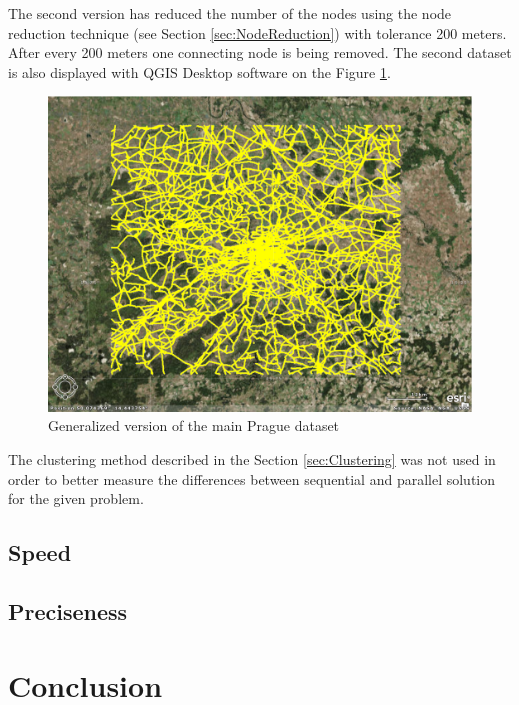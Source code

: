 \documentclass[thesis=M,english]{FITthesis}[2012/10/20]
\begin{document}
The second version has reduced the number of the nodes using the node reduction technique (see Section \ref{sec:NodeReduction}) with tolerance 200 meters. After every 200 meters one connecting node is being removed.
The second dataset is also displayed with QGIS Desktop software on the Figure \ref{pic:dataset2}.
\begin{figure}[H]
\centering
\includegraphics[width=1\textwidth]{pics/praguedatasetS}
\caption{Generalized version of the main Prague dataset}
\label{pic:dataset2}
\end{figure}

The clustering method described in the Section \ref{sec:Clustering} was not used in order to better measure the differences between sequential and parallel solution for the given problem. 

\section{Speed}

\section{Preciseness}

\chapter{Conclusion}




\appendix
\end{document}

